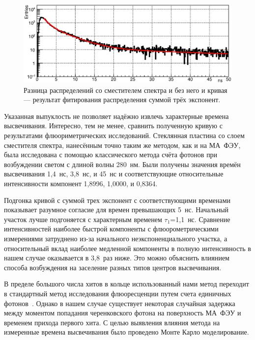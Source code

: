\begin{figure}[H]
\centering
\includegraphics[width=1.0\textwidth]{pictures/27_WLSdiff_8feb.eps}
\caption{Разница распределений со сместителем спектра и без него и кривая --- результат фитирования распределения суммой трёх экспонент.}
\label{fig:WLSdiff}
\end{figure}

Указанная выпуклость не позволяет надёжно извлечь характерные времена высвечивания. Интересно, тем не менее, сравнить полученную кривую с результатами флюориметрических исследований. Стеклянная пластина со слоем сместителя спектра, нанесённым точно таким же методом, как и на МА~ФЭУ, была исследована с помощью классического метода счёта фотонов при возбуждении светом с длиной волны 280~нм. Были получены значения времён высвечивания 1,4~нс, 3,8~нс, и 45~нс и соответствующие относительные интенсивности компонент 1,8996, 1,0000, и 0,8364.




Подгонка кривой с  суммой трех экспонент с соответствующими временами показывает разумное согласие для времен превышающих 5~нс. Начальный участок лучше подгоняется с характерным временем $\tau_{1}$=1,1~нс. Сравнение интенсивностей наиболее быстрой компоненты с флюорометрическими измерениями затруднено из-за начального неэкспоненциального участка, а относительный вклад наиболее медленной компоненты в полную интенсивность в нашем случае оказывается в 3,8~раз ниже. Это можно объяснить влиянием способа возбуждения на заселение разных типов центров высвечивания.

В пределе большого числа хитов в кольце использованный нами метод переходит в стандартный метод исследования флюоресценции путем счета единичных фотонов~\cite{SPC}. Однако в нашем случае существует некоторая случайная задержка между моментом попадания черенковского фотона на поверхность МА~ФЭУ и временем прихода первого хита. С целью выявления влияния метода на измеренные времена высвечивания было проведено Монте Карло моделирование.

